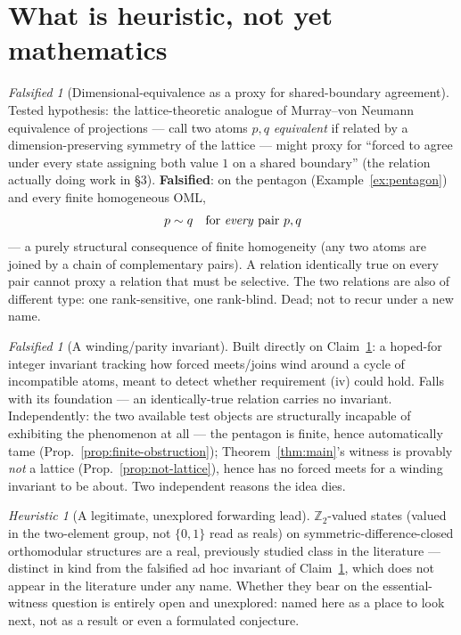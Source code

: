 \documentclass[11pt]{article}
\theoremstyle{remark}
\newtheorem{heuristic}[theorem]{Heuristic}
\newtheorem{falsified}[theorem]{Falsified}
\begin{document}
\section{What is heuristic, not yet mathematics}

\begin{falsified}[Dimensional-equivalence as a proxy for shared-boundary
agreement]
\label{fals:perspectivity}
Tested hypothesis: the lattice-theoretic analogue of Murray--von Neumann
equivalence of projections — call two atoms $p,q$ \emph{equivalent} if
related by a dimension-preserving symmetry of the lattice — might proxy for
``forced to agree under every state assigning both value $1$ on a shared
boundary'' (the relation actually doing work in \S3). \textbf{Falsified}: on
the pentagon (Example~\ref{ex:pentagon}) and every finite homogeneous OML,
\[
  p \sim q \quad \text{for \emph{every} pair } p,q
\]
— a purely structural consequence of finite homogeneity (any two atoms are
joined by a chain of complementary pairs). A relation identically true on
every pair cannot proxy a relation that must be selective. The two relations
are also of different type: one rank-sensitive, one rank-blind. Dead; not to
recur under a new name.
\end{falsified}

\begin{falsified}[A winding/parity invariant]
\label{fals:winding}
Built directly on Claim~\ref{fals:perspectivity}: a hoped-for integer
invariant tracking how forced meets/joins wind around a cycle of incompatible
atoms, meant to detect whether requirement (iv) could hold. Falls with its
foundation — an identically-true relation carries no invariant. Independently:
the two available test objects are structurally incapable of exhibiting the
phenomenon at all — the pentagon is finite, hence automatically tame
(Prop.~\ref{prop:finite-obstruction}); Theorem~\ref{thm:main}'s witness is
provably \emph{not} a lattice (Prop.~\ref{prop:not-lattice}), hence has no
forced meets for a winding invariant to be about. Two independent reasons the
idea dies.
\end{falsified}

\begin{heuristic}[A legitimate, unexplored forwarding lead]
\label{heur:z2states}
$\mathbb Z_2$-valued states (valued in the two-element group, not $\{0,1\}$
read as reals) on symmetric-difference-closed orthomodular structures are a
real, previously studied class in the literature — distinct in kind from the
falsified ad hoc invariant of Claim~\ref{fals:winding}, which does not appear
in the literature under any name. Whether they bear on the essential-witness
question is entirely open and unexplored: named here as a place to look
next, not as a result or even a formulated conjecture.
\end{heuristic}
\end{document}
